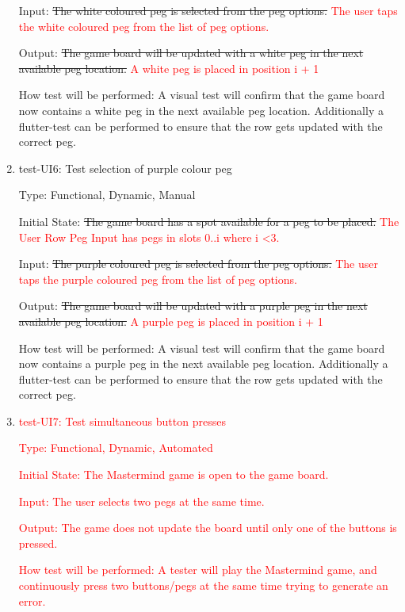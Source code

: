 \documentclass[12pt, titlepage]{article}
\begin{document}
\begin{enumerate}
Input: \sout{The white coloured peg is selected from the peg options.} \textcolor{red}{The user taps the white coloured peg from the list of peg options.}
					
Output: \sout{The game board will be updated with a white peg in the next available peg location.} \textcolor{red}{A white peg is placed in position i + 1}
					
How test will be performed: A visual test will confirm that the game board now contains a white peg in the next available peg location. Additionally a flutter-test can be performed to ensure that the row gets updated with the correct peg.\\

\item{test-UI6: Test selection of purple colour peg\\}

Type: Functional, Dynamic, Manual
					
Initial State: \sout{The game board has a spot available for a peg to be placed.} \textcolor{red}{The User Row Peg Input has pegs in slots 0..i where i \textless 3.}
					
Input: \sout{The purple coloured peg is selected from the peg options.} \textcolor{red}{The user taps the purple coloured peg from the list of peg options.}
					
Output: \sout{The game board will be updated with a purple peg in the next available peg location.} \textcolor{red}{A purple peg is placed in position i + 1}
					
How test will be performed: A visual test will confirm that the game board now contains a purple peg in the next available peg location. Additionally a flutter-test can be performed to ensure that the row gets updated with the correct peg.\\

\item{\textcolor{red}{test-UI7: Test simultaneous button presses}\\}

\textcolor{red}{
Type: Functional, Dynamic, Automated}

\textcolor{red}{Initial State: The Mastermind game is open to the game board.}

\textcolor{red}{Input: The user selects two pegs at the same time.}

\textcolor{red}{Output: The game does not update the board until only one of the buttons is pressed.}

\textcolor{red}{How test will be performed: A tester will play the Mastermind game, and continuously press two buttons/pegs at the same time trying to generate an error.
}


\end{enumerate}
\end{document}
